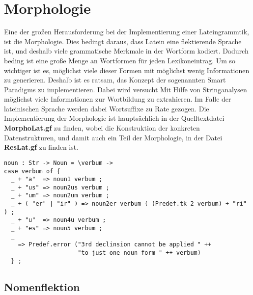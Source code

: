 \documentclass[12pt,abstract=on]{scrreprt}
\begin{document}
\section{Morphologie}
Eine der großen Herausforderung bei der Implementierung einer Lateingrammtik, ist die Morphologie. Dies bedingt daraus, dass Latein eine flektierende Sprache ist, und deshalb viele grammatische Merkmale in der Wortform kodiert. Dadurch beding ist eine große Menge an Wortformen für jeden Lexikoneintrag. Um so wichtiger ist es, möglichst viele dieser Formen mit möglichst wenig Informationen zu generieren. Deshalb ist es ratsam, das Konzept der sogenannten Smart Paradigms zu implementieren. Dabei wird versucht Mit Hilfe von Stringanalysen möglichst viele Informationen zur Wortbildung zu extrahieren. Im Falle der lateinischen Sprache werden dabei Wortsuffixe zu Rate gezogen. Die Implementierung der Morphologie ist hauptsächlich in der Quelltextdatei \textbf{MorphoLat.gf} zu finden, wobei die Konstruktion der konkreten Datenstrukturen, und damit auch ein Teil der Morphologie, in der Datei \textbf{ResLat.gf} zu finden ist.
\begin{lstlisting}[float=ht,caption={Beispiel für ein Smart Paradigm mit Hilfe von Pattern matching},label={GF-Morpho-Noun}]
noun : Str -> Noun = \verbum -> 
case verbum of {
  _ + "a"  => noun1 verbum ;
  _ + "us" => noun2us verbum ;
  _ + "um" => noun2um verbum ;
  _ + ( "er" | "ir" ) => noun2er verbum ( (Predef.tk 2 verbum) + "ri" ) ;
  _ + "u"  => noun4u verbum ;
  _ + "es" => noun5 verbum ;
  _  
    => Predef.error ("3rd declinsion cannot be applied " ++ 
                     "to just one noun form " ++ verbum)
  } ;
\end{lstlisting}
\subsection{Nomenflektion}
\end{document}
